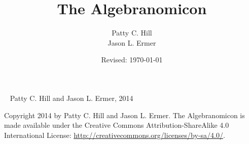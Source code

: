% 
%

\title{{\Huge\textbf{The Algebranomicon}}}
\author{Patty C. Hill \\ Jason L. Ermer}
\date{Revised: \today}

\maketitle

\pagestyle{empty}
\null
\vfill
\noindent
{} ~ Patty C. Hill and Jason L. Ermer, 2014


Copyright {2014} by Patty C. Hill and Jason L. Ermer. The Algebranomicon is made available under the Creative Commons Attribution-ShareAlike 4.0 International License: \url{http://creativecommons.org/licenses/by-sa/4.0/}.

